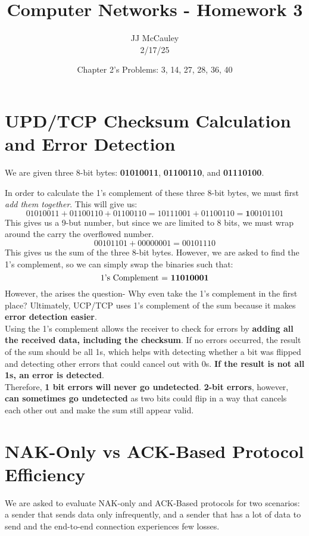 \documentclass{article}
\title{Computer Networks - Homework 3}
\author{JJ McCauley \\ 2/17/25}
\date{Chapter 2's Problems: 3, 14, 27, 28, 36, 40}
\begin{document}
\maketitle

\setcounter{section}{2}
\section{UPD/TCP Checksum Calculation and Error Detection}
We are given three 8-bit bytes: \textbf{01010011}, \textbf{01100110}, and \textbf{01110100}. 

In order to calculate the 1's complement of these three 8-bit bytes, we must first \textit{add them together}. This will give us:
\[
01010011 + 01100110 + 01100110 = 10111001 + 01100110 =  \textbf{1} 00101101
\]
This gives us a 9-but number, but since we are limited to 8 bits, we must wrap around the carry the overflowed number.
\[
00101101 + 00000001 = 00101110
\]
This gives us the sum of the three 8-bit bytes. However, we are asked to find the 1's complement, so we can simply swap the binaries such that:
\[
\text{1's Complement = \textbf{11010001}}
\]
However, the arises the question- Why even take the 1's complement in the first place? Ultimately, UCP/TCP uses 1's complement of the sum because it makes \textbf{error detection easier}. \\

Using the 1's complement allows the receiver to check for errors by \textbf{adding all the received data, including the checksum}. If no errors occurred, the result of the sum should be all 1s, which helps with detecting whether a bit was flipped and detecting other errors that could cancel out with 0s. \textbf{If the result is not all 1s, an error is detected}. \\

Therefore, \textbf{1 bit errors will never go undetected}. \textbf{2-bit errors}, however, \textbf{can sometimes go undetected} as two bits could flip in a way that cancels each other out and make the sum still appear valid.

\setcounter{section}{13}
\section{NAK-Only vs ACK-Based Protocol Efficiency}
We are asked to evaluate NAK-only and ACK-Based protocols for two scenarios: a sender that sends data only infrequently, and a sender that has a lot of data to send and the end-to-end connection experiences few losses.
\end{document}
